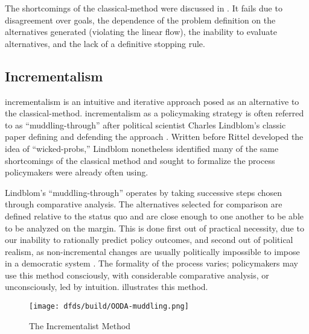 The shortcomings of the \ac{classical-method} were discussed in . It fails due to
disagreement over goals, the dependence of the problem definition on the alternatives generated (violating the linear
flow), the inability to evaluate alternatives, and the lack of a definitive stopping rule.

\subsection{Incrementalism}

\Ac{incrementalism} is an intuitive and iterative approach posed as an alternative to the \ac{classical-method}.
\Ac{incrementalism} as a policymaking strategy is often referred to as ``\ac{muddling-through}'' after political
scientist Charles Lindblom's classic paper defining and defending the approach \cite{lindblom_muddling_1959}. Written
before Rittel developed the idea of ``\acp{wicked-prob},'' Lindblom nonetheless identified many of the same shortcomings
of the classical method and sought to formalize the process policymakers were already often using.

Lindblom's ``\ac{muddling-through}'' operates by taking successive steps chosen through comparative analysis. The
alternatives selected for comparison are defined relative to the status quo and are close enough to one another to be
able to be analyzed on the margin. This is done first out of practical necessity, due to our inability to rationally
predict policy outcomes, and second out of political realism, as non-incremental changes are usually politically
impossible to impose in a democratic system \cite{lindblom_muddling_1959}. The formality of the process varies;
policymakers may use this method consciously, with considerable comparative analysis, or unconsciously, led by
intuition.  illustrates this method.


\begin{figure}[h]
  \centering\CaptionFontSize
  \texttt{[image: dfds/build/OODA-muddling.png]}
  \caption[The Incrementalist Method]{The Incrementalist Method}
  \label{fig-muddling-through}
\end{figure}

